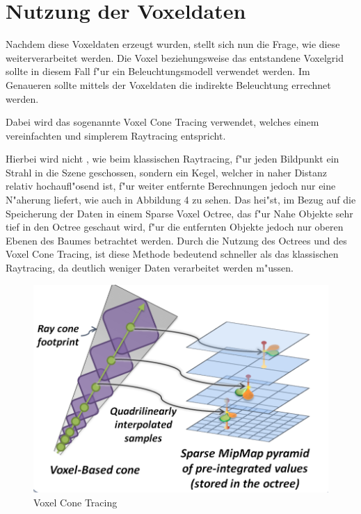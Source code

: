 \documentclass[a4paper, 12pt]{scrartcl}
\begin{document}
\section{Nutzung der Voxeldaten}
Nachdem diese Voxeldaten erzeugt wurden, stellt sich nun die Frage, wie diese weiterverarbeitet werden.
Die Voxel beziehungsweise das entstandene Voxelgrid sollte in diesem Fall f"ur ein Beleuchtungsmodell verwendet werden. Im Genaueren sollte mittels der Voxeldaten die indirekte Beleuchtung errechnet werden.

Dabei wird das sogenannte Voxel Cone Tracing verwendet, welches einem vereinfachten und simplerem Raytracing entspricht.

Hierbei wird nicht , wie beim klassischen Raytracing, f"ur jeden Bildpunkt ein Strahl in die Szene geschossen, sondern ein Kegel, welcher in naher Distanz relativ hochaufl"osend ist, f"ur weiter entfernte Berechnungen jedoch nur eine N"aherung liefert, wie auch in Abbildung 4 zu sehen.
Das hei"st, im Bezug auf die Speicherung der Daten in einem Sparse Voxel Octree, das f"ur Nahe Objekte sehr tief in den Octree geschaut wird, f"ur die entfernten Objekte jedoch nur oberen Ebenen des Baumes betrachtet werden.
Durch die Nutzung des Octrees und des Voxel Cone Tracing, ist diese Methode bedeutend schneller als das klassischen Raytracing, da deutlich weniger Daten verarbeitet werden m"ussen.

\begin{figure}[h]
	\centering
		\includegraphics[width=12cm]{voxel-cone-tracing}
	\caption{Voxel Cone Tracing}
\end{figure}

\newpage
\end{document}
